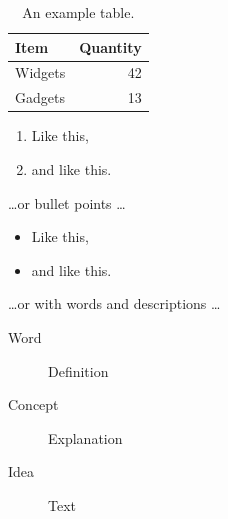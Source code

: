 \documentclass[a4paper]{article}
\begin{document}
\begin{table}
\centering
\begin{tabular}{l|r}
Item & Quantity \\\hline
Widgets & 42 \\
Gadgets & 13
\end{tabular}
\caption{\label{tab:widgets}An example table.}
\end{table}


\begin{enumerate}
\item Like this,
\item and like this.
\end{enumerate}
\dots or bullet points \dots
\begin{itemize}
\item Like this,
\item and like this.
\end{itemize}
\dots or with words and descriptions \dots
\begin{description}
\item[Word] Definition
\item[Concept] Explanation
\item[Idea] Text
\end{description}
\end{document}

